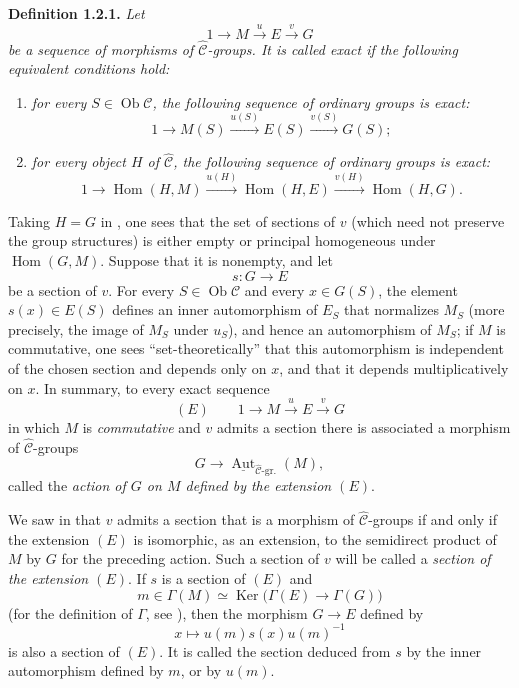 \medskip
\noindent{}\textbf{Definition 1.2.1.}
\textit{Let}
\[
 1\longrightarrow M\xrightarrow{u}E\xrightarrow{v}G
\]
\textit{be a sequence of morphisms of \(\widehat{\mathscr C}\)-groups.
It is called \emph{exact} if the following equivalent conditions hold:}
\begin{enumerate}
 \item[(i)] \textit{for every \(S\in\operatorname{Ob}\mathscr C\),
 the following sequence of ordinary groups is exact:}
 \[
  1\longrightarrow M(S)\xrightarrow{u(S)}E(S)
   \xrightarrow{v(S)}G(S);
 \]

 \item[\SGAInlineRefTarget{sga3:iii:definition:1-2-1:item:ii}(ii)] \textit{for every object \(H\) of
 \(\widehat{\mathscr C}\), the following sequence of ordinary groups
 is exact:}
 \[
  1\longrightarrow\operatorname{Hom}(H,M)
   \xrightarrow{u(H)}\operatorname{Hom}(H,E)
   \xrightarrow{v(H)}\operatorname{Hom}(H,G).
 \]
\end{enumerate}

Taking \(H=G\) in , one sees that the set of sections of \(v\)
(which need not preserve the group structures) is either empty or
principal homogeneous under \(\operatorname{Hom}(G,M)\). Suppose that
it is nonempty, and let
\[
 s:G\longrightarrow E
\]
be a section of \(v\). For every \(S\in\operatorname{Ob}\mathscr C\)
and every \(x\in G(S)\), the element \(s(x)\in E(S)\) defines an
inner automorphism of \(E_S\) that normalizes \(M_S\) (more precisely,
the image of \(M_S\) under \(u_S\)), and hence an automorphism of
\(M_S\); if \(M\) is commutative, one sees ``set-theoretically'' that this
automorphism is independent of the chosen section and depends only on
\(x\), and that it depends multiplicatively on \(x\). In summary, to every
exact sequence
\[
 (E)\qquad
 1\longrightarrow M\xrightarrow{u}E\xrightarrow{v}G
\]
in which \(M\) is \emph{commutative} and \(v\) admits a section there is
associated a morphism of \(\widehat{\mathscr C}\)-groups
\[
 G\longrightarrow
 \underline{\operatorname{Aut}}_{\widehat{\mathscr C}\text{-gr.}}(M),
\]
called the \emph{action of \(G\) on \(M\) defined by the
extension \((E)\)}.

We saw in  that \(v\) admits a section that is a morphism of
\(\widehat{\mathscr C}\)-groups if and only if the extension \((E)\)
is isomorphic, as an extension, to the semidirect product of \(M\) by
\(G\) for the preceding action. Such a section of \(v\) will be called a
\emph{section of the extension \((E)\)}. If \(s\) is a section of \((E)\) and
\[
 m\in\Gamma(M)\simeq
 \operatorname{Ker}\bigl(\Gamma(E)\to\Gamma(G)\bigr)
\]
(for the definition of \(\Gamma\), see ), then the morphism
\(G\to E\) defined by
\[
 x\longmapsto u(m)s(x)u(m)^{-1}
\]
is also a section of \((E)\). It is called
the section deduced from \(s\) by the inner automorphism defined by
\(m\), or by \(u(m)\).


